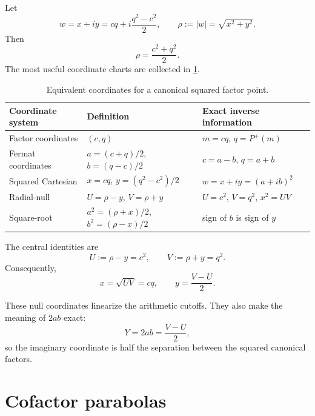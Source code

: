 \documentclass[11pt]{article}
\theoremstyle{definition}
\theoremstyle{remark}
\newcommand{\Pplus}{P^{+}}
\newcommand{\1}{\mathbf{1}}
\begin{document}
Let
\begin{equation}
 w=x+iy
 =cq+i\frac{q^2-c^2}{2},
 \qquad
 \rho:=|w|=\sqrt{x^2+y^2}.
 \label{eq:w-rho}
\end{equation}
Then
\begin{equation}
 \rho=\frac{c^2+q^2}{2}.
 \label{eq:rho-cq}
\end{equation}
The most useful coordinate charts are collected in \cref{tab:coordinates}.

\begin{table}[htbp]
\centering
\caption{Equivalent coordinates for a canonical squared factor point.}
\label{tab:coordinates}
\renewcommand{\arraystretch}{1.35}
\begin{tabular}{>{\raggedright\arraybackslash}p{} >{\raggedright\arraybackslash}p{} >{\raggedright\arraybackslash}p{}}
\toprule
Coordinate system & Definition & Exact inverse information\\
\midrule
Factor coordinates & $(c,q)$ & $m=cq$, $q=\Pplus(m)$\\
Fermat coordinates & $a=(c+q)/2$, $b=(q-c)/2$ & $c=a-b$, $q=a+b$\\
Squared Cartesian & $x=cq$, $y=(q^2-c^2)/2$ & $w=x+iy=(a+ib)^2$\\
Radial-null & $U=\rho-y$, $V=\rho+y$ & $U=c^2$, $V=q^2$, $x^2=UV$\\
Square-root & $a^2=(\rho+x)/2$, $b^2=(\rho-x)/2$ & sign of $b$ is sign of $y$\\
\bottomrule
\end{tabular}
\end{table}

The central identities are
\begin{equation}
 \boxed{
 U:=\rho-y=c^2,
 \qquad
 V:=\rho+y=q^2.
 }
 \label{eq:UV}
\end{equation}
Consequently,
\begin{equation}
 x=\sqrt{UV}=cq,
 \qquad
 y=\frac{V-U}{2}.
 \label{eq:xy-UV}
\end{equation}

These null coordinates linearize the arithmetic cutoffs.  They also make the meaning of $2ab$ exact:
\begin{equation}
 \boxed{Y=2ab=\frac{V-U}{2},}
 \label{eq:Y-null}
\end{equation}
so the imaginary coordinate is half the separation between the squared canonical factors.

\section{Cofactor parabolas}
\label{sec:cofactor-curves}
\end{document}
